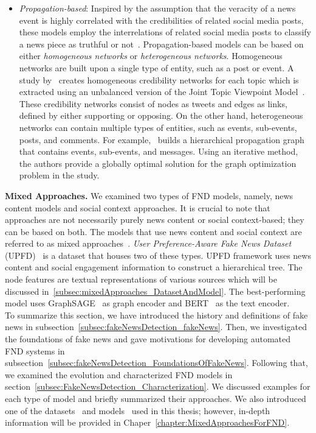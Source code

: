 \begin{itemize}
    \item \emph{Propagation-based}: Inspired by the assumption that the veracity of a news event is highly correlated with the credibilities of related social media posts, these models employ the interrelations of related social media posts to classify a news piece as truthful or not~\parencite{FakeNewsDetectionOnSocialMediaADataMiningPerspective_Shu}. Propagation-based models can be based on either \emph{homogeneous networks} or \emph{heterogeneous networks}. Homogeneous networks are built upon a single type of entity, such as a post or event. A study by~\cite{NewsVerificationByExploitingConflictingSocialViewpoints_Jin} creates homogeneous credibility networks for each topic which is extracted using an unbalanced version of the Joint Topic Viewpoint Model~\parencite{FindingAndArguingExpressions_Trabelsi}. These credibility networks consist of nodes as tweets and edges as links, defined by either supporting or opposing. On the other hand, heterogeneous networks can contain multiple types of entities, such as events, sub-events, posts, and comments. For example,~\cite{NewsCredibilityEvaluationOnMicroblog_Jin} builds a hierarchical propagation graph that contains events, sub-events, and messages. Using an iterative method, the authors provide a globally optimal solution for the graph optimization problem in the study.\\
\end{itemize}
\textbf{Mixed Approaches.} We examined two types of FND models, namely,  news content models and social context approaches. It is crucial to note that approaches are not necessarily purely news content or social context-based; they can be based on both. The models that use news content and social context are referred to as mixed approaches~\parencite{GraphNeuralNetworksWithContinualLearningFakeNewsDetection_Han}. \emph{User Preference-Aware Fake News Dataset} (UPFD)~\parencite{UPFD_Dataset_Shu} is a dataset that houses two of these types. UPFD framework uses news content and social engagement information to construct a hierarchical tree. The node features are textual representations of various sources which will be discussed in~\ref{subsec:mixedApproaches_DatasetAndModel}. The best-performing model uses GraphSAGE~\parencite{GraphSAGE_Hamilton} as graph encoder and BERT~\parencite{BERT_Devlin} as the text encoder.\\
To summarize this section, we have introduced the history and definitions of fake news in subsection~\ref{subsec:fakeNewsDetection_fakeNews}. Then, we investigated the foundations of fake news and gave motivations for developing automated FND systems in subsection~\ref{subsec:fakeNewsDetection_FoundationsOfFakeNews}. Following that, we examined the evolution and characterized FND models in section~\ref{subsec:FakeNewsDetection_Characterization}. We discussed examples for each type of model and briefly summarized their approaches. We also introduced one of the datasets~\parencite{UPFD_Dataset_Shu} and models~\parencite{GraphSAGE_Hamilton} used in this thesis; however, in-depth information will be provided in Chaper~\ref{chapter:MixedApproachesForFND}.\\
